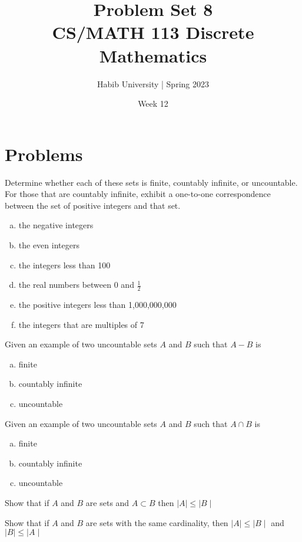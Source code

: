 \documentclass{article}
\newenvironment{problem}[2][Problem]{\begin{trivlist}
\item[\hskip \labelsep {\bfseries #1}\hskip \labelsep {\bfseries #2.}]}{\end{trivlist}}
\begin{document}
\title{Problem Set 8\\CS/MATH 113 Discrete Mathematics}
\author{Habib University | Spring 2023}
\date{Week 12}
\maketitle

\section{Problems}

\begin{problem}{1}[Chapter 2.5, Question 1]
Determine whether each of these sets is finite, countably
infinite, or uncountable. For those that are countably infinite, exhibit a one-to-one correspondence between the
set of positive integers and that set.
\begin{enumerate}[(a)]
    \item the negative integers
    \item the even integers
    \item the integers less than 100
    \item the real numbers between 0 and $\frac{1}{2}$
    \item the positive integers less than 1,000,000,000
    \item the integers that are multiples of 7
\end{enumerate}
\end{problem}
\begin{problem}{2}[Chapter 2.5, Questions 10]
Given an example of two uncountable sets $A$ and $B$ such that $ A - B$ is
\begin{enumerate}[(a)]
    \item finite
    \item countably infinite
    \item uncountable
\end{enumerate}
\end{problem}
\begin{problem}{3}[Chapter 2.5, Questions 11]
Given an example of two uncountable sets $A$ and $B$ such that $ A \cap B$ is
\begin{enumerate}[(a)]
    \item finite
    \item countably infinite
    \item uncountable
\end{enumerate}
\end{problem}

\begin{problem}{4}[Chapter 2.5, Questions 12]
Show that if $A$ and $B$ are sets and $ A \subset B$ then $ \mid A \mid \leq \mid B \mid $
\end{problem}

\begin{problem}{5}[Chapter 2.5, Questions 14]
    Show that if $A$ and $B$ are sets with the same cardinality, then $ \mid A \mid \leq \mid B \mid$  and $ \mid B \mid \leq \mid A \mid  $
\end{problem}
    
\end{document}

